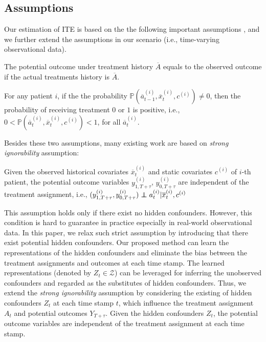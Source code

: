 \vspace{-5pt}
\subsection{Assumptions}
Our estimation of ITE is based on the the following important assumptions \cite{hernan2010causal}, and we further extend the assumptions in our scenario (i.e., time-varying observational data). 
\begin{assumption}[Consistency]\label{as:consistency}
The potential outcome under treatment history $\overline{A}$ equals to the observed outcome if the actual treatments history is $\overline{A}$.
\end{assumption}

\begin{assumption}[Positivity]\label{as:positivity}
For any patient $i$, if the the probability $\mathbb{P}(\overline{a}^{(i)}_{t-1},\overline{x}^{(i)}_{t}, c^{(i)})\neq0$, then the probability of receiving treatment $0$ or $1$ is positive, i.e., $0<\mathbb{P}(\overline{a}^{(i)}_{t},\overline{x}^{(i)}_{t}, c^{(i)})<1$, for all $\overline{a}^{(i)}_{t}$.   
\end{assumption}
Besides these two assumptions, many existing work are based on \textit{strong ignorability} assumption:
\begin{assumption}\label{as:ignorability}
Given the observed historical covariates $\overline{x}^{(i)}_t$ and static covariates $c^{(i)}$ of $i$-th patient, the potential outcome variables $y^{(i)}_{1,T+\tau}$, $y^{(i)}_{0,T+\tau}$ are independent of the treatment assignment, i.e., $(y^{(i)}_{1,T+\tau},y^{(i)}_{0,T+\tau})\independent a^{(i)}_{t}|\overline{x}^{(i)}_t,c^{(i)}$
\end{assumption}


This assumption holds only if there exist no hidden confounders. However, this condition is hard to guarantee in practice especially in real-world observational data. In this paper, we relax such strict assumption by introducing that there exist potential hidden confounders. Our proposed method can learn the representations of the hidden confounders and eliminate the bias between the treatment assignments and outcomes at each time stamp. The learned representations (denoted by $Z_{t}\in\mathcal{Z}$) can be leveraged for inferring the unobserved confounders and regarded as the substitutes of hidden confounders. Thus, we extend the \textit{strong ignorability} assumption by considering the existing of hidden confounders $Z_{t}$ at each time stamp $t$, which influence the treatment assignment $A_t$ and potential outcomes $Y_{T+\tau}$. Given the hidden confounders $Z_{t}$, the potential outcome variables are independent of the treatment assignment at each time stamp. 

